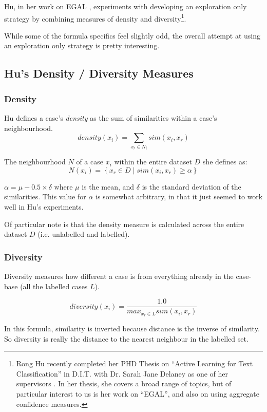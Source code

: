 \documentclass[a4paper,11pt]{report}
\begin{document}
Hu, in her work on EGAL \citep{Hu2011}, experiments with developing an exploration only strategy by combining measures of density and diversity\footnote{Rong Hu recently completed her PHD Thesis on ``Active Learning for Text Classification'' in D.I.T. with Dr. Sarah Jane Delaney as one of her supervisors \citep{Hu2011}. In her thesis, she covers a broad range of topics, but of particular interest to us is her work on ``EGAL'', and also on using aggregate confidence measures.}.

While some of the formula specifics feel slightly odd, the overall attempt at using an exploration only strategy is pretty interesting. 

\subsection{Hu's Density / Diversity Measures}

\subsubsection{Density}
Hu defines a case's \emph{density} as the sum of similarities within a case's neighbourhood.
\[
density(x_{i})=\underset{x_{r}\in N_{i}}{\sum}sim(x_{i},x_{r})
\]

The neighbourhood $N$ of a case $x_{i}$ within the entire dataset $D$ she defines as:
\[
N(x_{i})=\left\{ x_{r}\in D\mid sim(x_{i},x_{r})\geq\alpha\right\} 
\]

$\alpha=\mu-0.5\times\delta$ where $\mu$ is the mean, and $\delta$ is the standard deviation of the similarities. This value for $\alpha$ is somewhat arbitrary, in that it just seemed to work well in Hu's experiments.

Of particular note is that the density measure is calculated across the entire dataset $D$ (i.e. unlabelled and labelled). 

\subsubsection{Diversity}

Diversity measures how different a case is from everything already in the case-base (all the labelled cases $L$).

\[
diversity(x_{i})=\frac{1.0}{max_{x_{r}\in L}sim(x_{i},x_{r})}
\]

In this formula, similarity is inverted because distance is the inverse of similarity. So diversity is really the distance to the nearest neighbour in the labelled set.
\end{document}
